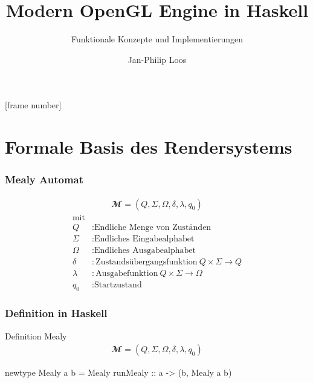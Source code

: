
[frame number]



\title[Haskell Engine]{Modern OpenGL Engine in Haskell}
\subtitle[Konzepte]{Funktionale Konzepte und Implementierungen}
\author{Jan-Philip Loos}
\date{\protect{}}
\maketitle
{}


\section{Formale Basis des Rendersystems}
\frame{\sectionpage}

\begin{frame}
  \frametitle{Mealy Automat}
  \begin{Definition}
    \begin{align}
    \mathbfcal{M} = \left( Q, \Sigma, \Omega, \delta, \lambda, q_0 \right)
    \label{def:mealy-formal}
    \end{align}
    \begin{align*}
    	\text{mit}\\
    	Q &: \text{Endliche Menge von Zuständen} \\
    	\Sigma  &:\text{Endliches Eingabealphabet} \\
    	\Omega  &:\text{Endliches Ausgabealphabet} \\
    	\delta  &:\text{Zustandsübergangsfunktion}\ Q \times \Sigma \rightarrow Q \\
    	\lambda &:\text{Ausgabefunktion}\ Q \times \Sigma \rightarrow \Omega \\
    	q_0 &: \text{Startzustand}
    \end{align*}
  \end{Definition}
\end{frame}

\begin{frame}[fragile]
  \frametitle{Definition in Haskell}
  \begin{block}{Definition Mealy}
    \begin{align*}
    \mathbfcal{M} = \left( Q, \Sigma, \Omega, \delta, \lambda, q_0 \right)
    \label{def:mealy-formal}
  \end{align*}
  \end{block}
  \begin{haskell}[label={lst:haskell-mealy},caption={[Definition Mealy in Haskell]Definition Mealy in Haskell\protect\footnotemark}]
newtype Mealy a b = Mealy {
  runMealy :: a -> (b, Mealy a b)
}
  \end{haskell}
\end{frame}

